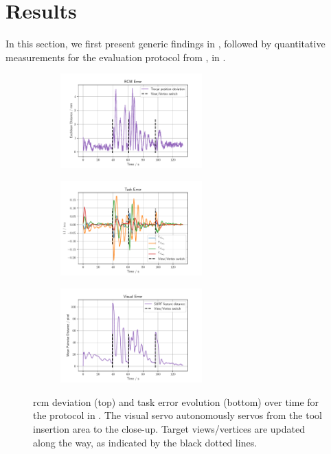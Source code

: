 \section{Results}
\label{c2:sec:results}
In this section, we first present generic findings in , followed by quantitative measurements for the evaluation protocol from , in .
\begin{figure}
\centering
\begin{subfigure}[b]{\textwidth}
    \centering
    \includegraphics[width=0.6\textwidth]{fig/rcm_error.pdf}
\end{subfigure}
\begin{subfigure}[b]{\textwidth}
    \centering
    \includegraphics[width=0.6\textwidth]{fig/task_error.pdf}
\end{subfigure}
\begin{subfigure}[b]{\textwidth}
\centering
\includegraphics[width=0.6\textwidth]{fig/visual_error.pdf}
\end{subfigure}
\caption{\acrshort{rcm} deviation (top) and task error evolution (bottom) over time for the protocol in . The visual servo autonomously servos from the tool insertion area to the close-up. Target views/vertices are updated along the way, as indicated by the black dotted lines.}
\label{c2:fig:errors}
\end{figure}
